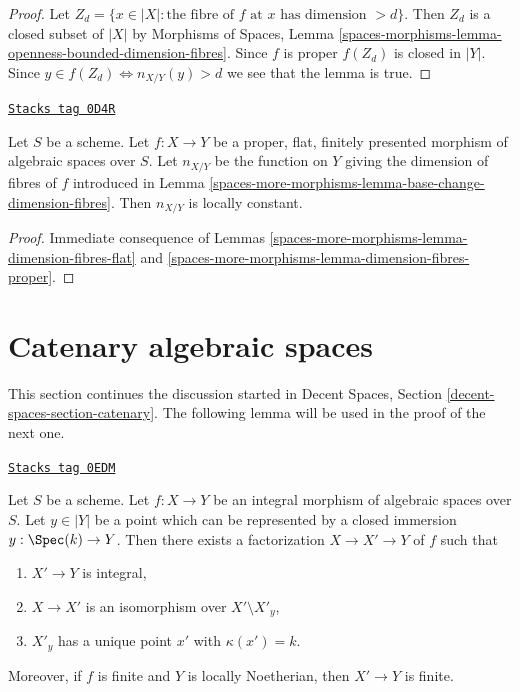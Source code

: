 \begin{proof}
Let $Z_d = \{x \in |X| :
\text{the fibre of }f\text{ at }x\text{ has dimension }> d\}$.
Then $Z_d$ is a closed subset of $|X|$ by
Morphisms of Spaces, Lemma
\ref{spaces-morphisms-lemma-openness-bounded-dimension-fibres}.
Since $f$ is proper $f(Z_d)$ is closed in $|Y|$.
Since $y \in f(Z_d) \Leftrightarrow n_{X/Y}(y) > d$
we see that the lemma is true.
\end{proof}

\begin{lemma}
\label{spaces-more-morphisms-lemma-dimension-fibres-proper-flat}
\href{https://stacks.math.columbia.edu/tag/0D4R}{\texttt{Stacks tag 0D4R}}

Let $S$ be a scheme. Let $f : X \to Y$ be a proper, flat, finitely presented
morphism of algebraic spaces over $S$.
Let $n_{X/Y}$ be the function on $Y$ giving the dimension of fibres of $f$
introduced in Lemma \ref{spaces-more-morphisms-lemma-base-change-dimension-fibres}.
Then $n_{X/Y}$ is locally constant.
\end{lemma}

\begin{proof}
Immediate consequence of
Lemmas \ref{spaces-more-morphisms-lemma-dimension-fibres-flat} and
\ref{spaces-more-morphisms-lemma-dimension-fibres-proper}.
\end{proof}

\section{Catenary algebraic spaces}
\label{spaces-more-morphisms-section-catenary}
This section continues the discussion started in
Decent Spaces, Section \ref{decent-spaces-section-catenary}.
The following lemma will be used in the proof of the next one.

\begin{lemma}
\label{spaces-more-morphisms-lemma-construct-glueing}
\href{https://stacks.math.columbia.edu/tag/0EDM}{\texttt{Stacks tag 0EDM}}

Let $S$ be a scheme. Let $f : X \to Y$ be an integral morphism
of algebraic spaces over $S$.
Let $y \in |Y|$ be a point which can be represented by a closed immersion
$y : \Spec(k) \to Y$. Then there exists
a factorization $X \to X' \to Y$ of $f$ such that
\begin{enumerate}
\item $X' \to Y$ is integral,
\item $X \to X'$ is an isomorphism over $X' \setminus X'_y$,
\item $X'_y$ has a unique point $x'$ with $\kappa(x') = k$.
\end{enumerate}
Moreover, if $f$ is finite and $Y$ is locally Noetherian, then
$X' \to Y$ is finite.
\end{lemma}

